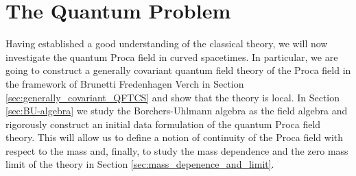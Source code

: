 \section{The Quantum Problem}\label{chpt:quantum}
Having established a good understanding of the classical theory, we will now investigate the quantum Proca field in curved spacetimes. In particular, we are going to construct a generally covariant quantum field theory of the Proca field in the framework of Brunetti Fredenhagen Verch \cite{Brunetti_Fredenhagen_Verch} in Section \ref{sec:generally_covariant_QFTCS} and show that the theory is local. In Section \ref{sec:BU-algebra} we study the Borchers-Uhlmann algebra as the field algebra and rigorously construct an initial data formulation of the quantum Proca field theory. This will allow us to define a notion of continuity of the Proca field with respect to the mass and, finally, to study the mass dependence and the zero mass limit of the theory in Section \ref{sec:mass_depenence_and_limit}.
%
%
%
%
%
